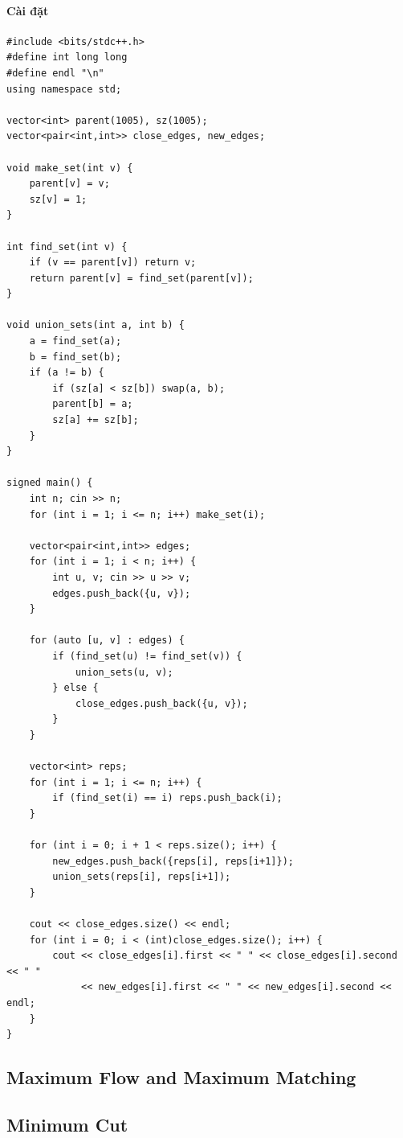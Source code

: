 \documentclass{article}
\begin{document}
\paragraph{Cài đặt}
\begin{lstlisting}
#include <bits/stdc++.h>
#define int long long
#define endl "\n"
using namespace std;

vector<int> parent(1005), sz(1005);
vector<pair<int,int>> close_edges, new_edges;

void make_set(int v) {
    parent[v] = v;
    sz[v] = 1;
}

int find_set(int v) {
    if (v == parent[v]) return v;
    return parent[v] = find_set(parent[v]);
}

void union_sets(int a, int b) {
    a = find_set(a);
    b = find_set(b);
    if (a != b) {
        if (sz[a] < sz[b]) swap(a, b);
        parent[b] = a;
        sz[a] += sz[b];
    }
}

signed main() {
    int n; cin >> n;
    for (int i = 1; i <= n; i++) make_set(i);

    vector<pair<int,int>> edges;
    for (int i = 1; i < n; i++) {
        int u, v; cin >> u >> v;
        edges.push_back({u, v});
    }

    for (auto [u, v] : edges) {
        if (find_set(u) != find_set(v)) {
            union_sets(u, v);
        } else {
            close_edges.push_back({u, v});
        }
    }

    vector<int> reps;
    for (int i = 1; i <= n; i++) {
        if (find_set(i) == i) reps.push_back(i);
    }

    for (int i = 0; i + 1 < reps.size(); i++) {
        new_edges.push_back({reps[i], reps[i+1]});
        union_sets(reps[i], reps[i+1]);
    }

    cout << close_edges.size() << endl;
    for (int i = 0; i < (int)close_edges.size(); i++) {
        cout << close_edges[i].first << " " << close_edges[i].second << " " 
             << new_edges[i].first << " " << new_edges[i].second << endl;
    }
}
\end{lstlisting}


\subsection{Maximum Flow and Maximum Matching}

\subsection{Minimum Cut}
\end{document}
